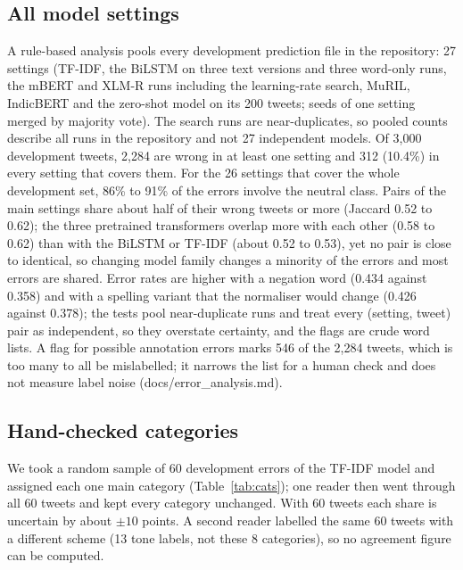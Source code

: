 \subsection{All model settings}
A rule-based analysis pools every development prediction file in the repository: 27 settings (TF-IDF, the BiLSTM on three text
versions and three word-only runs, the mBERT and XLM-R runs including the learning-rate search, MuRIL, IndicBERT and the zero-shot
model on its 200 tweets; seeds of one setting merged by majority vote). The search runs are near-duplicates, so pooled counts
describe all runs in the repository and not 27 independent models. Of 3{,}000 development tweets, 2{,}284 are wrong in at least one
setting and 312 (10.4\%) in every setting that covers them. For the 26 settings that cover the whole development set, 86\% to
91\% of the errors involve the neutral class. Pairs of the main settings share about half of their wrong tweets or more (Jaccard
0.52 to 0.62); the three pretrained transformers overlap more with each other (0.58 to 0.62) than with the BiLSTM or TF-IDF (about
0.52 to 0.53), yet no pair is close to identical, so changing model family changes a minority of the errors and most errors are
shared. Error rates are higher with a negation word (0.434 against 0.358) and with a spelling variant that the normaliser would
change (0.426 against 0.378); the tests pool near-duplicate runs and treat every (setting, tweet) pair as independent, so they
overstate certainty, and the flags are crude word lists. A flag for possible annotation errors marks 546 of the 2{,}284 tweets,
which is too many to all be mislabelled; it narrows the list for a human check and does not measure label noise
(docs/error\_analysis.md).

\subsection{Hand-checked categories}
We took a random sample of 60 development errors of the TF-IDF model and assigned each one main category (Table~\ref{tab:cats}); one reader then went through all 60 tweets and kept every category unchanged. With 60 tweets each share is uncertain by about $\pm10$ points. A second reader labelled the same 60 tweets with a different scheme (13 tone labels, not these 8 categories), so no agreement figure can be computed.

